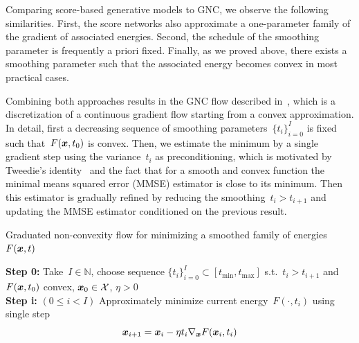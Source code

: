 \documentclass{article}
\newcommand{\N}{\mathbb{N}}
\newcommand{\X}{\mathcal{X}}
\newcommand{\tmin}{t_\mathrm{min}}
\newcommand{\tmax}{t_\mathrm{max}}
\theoremstyle{plain}
\theoremstyle{definition}
\theoremstyle{remark}
\begin{document}
Comparing score-based generative models to GNC, we observe the following similarities.
First, the score networks also approximate a one-parameter family of the gradient of associated energies.
Second, the schedule of the smoothing parameter is frequently a priori fixed.
Finally, as we proved above, there exists a smoothing parameter such that the associated energy becomes convex in most practical cases.

Combining both approaches results in the GNC flow described in~, which is a discretization of a continuous gradient flow starting from a convex approximation.
In detail, first a decreasing sequence of smoothing parameters~$\{t_i\}_{i=0}^I$ is fixed such that~$F({\bm{x}},t_0)$ is convex.
Then, we estimate the minimum by a single gradient step using the variance~$t_i$ as preconditioning, which is motivated by Tweedie's identity~\citep{Ro56,Ef11} and the fact that for a smooth and convex function the minimal means squared error (MMSE) estimator is close to its minimum.
Then this estimator is gradually refined by reducing the smoothing~$t_i>t_{i+1}$ and updating the MMSE estimator conditioned on the previous result.

\begin{algorithm}[t]
\caption{Graduated non-convexity flow for minimizing a smoothed family of energies~$F({\bm{x}},t)$}\label{alg:graduatedNC}
\textbf{Step 0:} Take~$I\in\N$, choose sequence $\{t_i\}_{i=0}^I\subset[\tmin,\tmax]$ s.t.~$t_{i}>t_{i+1}$ and~$F({\bm{x}},t_0)$ convex, $\vx_0\in\X$, $\eta>0$ \\
\textbf{Step i:} $(0\leq i< I)$ 
Approximately minimize current energy~$F(\cdot,t_i)$ using single step
\[
{\bm{x}}_{i+1}={\bm{x}}_i-\eta t_i\nabla_{\bm{x}} F({\bm{x}}_i,t_i)
\] 
\end{algorithm}
\end{document}
